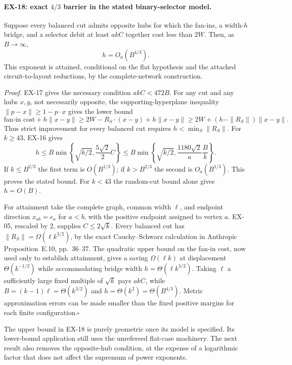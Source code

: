 \paragraph{EX-18: exact $4/3$ barrier in the stated binary-selector model.}
Suppose every balanced cut admits opposite hubs for which the fan-ins,
a width-$h$ bridge, and a selector debit at least $akC$ together cost less
than $2W$.  Then, as $B\to\infty$,
\[
 h=O_a(B^{4/3}).
\]
This exponent is attained, conditional on the flat hypothesis and the
attached circuit-to-layout reductions, by the complete-network construction.

\emph{Proof.}
EX-17 gives the necessary condition $akC<472B$.  For any cut and any hubs
$x,y$, not necessarily opposite, the supporting-hyperplane inequality
$\|p-x\|\geq1-p\cdot x$ gives the lower bound
\[
 \text{fan-in cost}+h\|x-y\|
 \geq2W-R_S\cdot(x-y)+h\|x-y\|
 \geq2W+(h-\|R_S\|)\|x-y\|.
\]
Thus strict improvement for every balanced cut requires
$h<\min_S\|R_S\|$.  For $k\geq43$, EX-16 gives
\[
 h\leq B\min\left\{\sqrt{k/2},\frac{5\sqrt2}{2}C\right\}
 \leq B\min\left\{\sqrt{k/2},
                  \frac{1180\sqrt2}{a}\frac Bk\right\}.
\]
If $k\leq B^{2/3}$ the first term is $O(B^{1/3})$; if
$k>B^{2/3}$ the second is $O_a(B^{1/3})$.  This proves the stated bound.
For $k<43$ the random-cut bound alone gives $h=O(B)$.

For attainment take the complete graph, common width $\ell$, and endpoint
direction $x_{ab}=e_a$ for $a<b$, with the positive endpoint assigned to
vertex $a$.  EX-05, rescaled by $2$, supplies $C\leq2\sqrt k$.
Every balanced cut has $\|R_S\|=\Omega(\ell k^{3/2})$, by the exact
Cauchy--Schwarz calculation in Anthropic Proposition~E.10, pp.~36--37.
The quadratic upper bound on the fan-in cost, now used only to establish
attainment, gives a saving $\Omega(\ell k)$ at displacement
$\Theta(k^{-1/2})$ while accommodating bridge width
$h=\Theta(\ell k^{3/2})$.  Taking $\ell$ a sufficiently large fixed
multiple of $\sqrt k$ pays $akC$, while
$B=(k-1)\ell=\Theta(k^{3/2})$ and $h=\Theta(k^2)=\Theta(B^{4/3})$.
Metric approximation errors can be made smaller than the fixed positive
margins for each finite configuration.\hfill$\square$

The upper bound in EX-18 is purely geometric once its model is specified.
Its lower-bound application still uses the unrefereed flat-case machinery.
The next result also removes the opposite-hub condition, at the expense of
a logarithmic factor that does not affect the supremum of power exponents.

